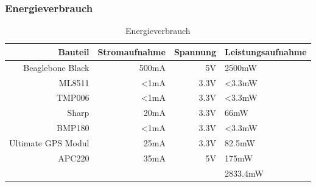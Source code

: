 \subsubsection{Energieverbrauch}
\begin{table}[H]
  \centering
    \begin{tabular}{rrrl}
    \toprule
    \textbf{Bauteil} & \textbf{Stromaufnahme} & \textbf{Spannung} & \textbf{Leistungsaufnahme} \\
    \midrule
    Beaglebone Black  & 500mA & 5V & 2500mW \\
    ML8511& <1mA & 3.3V & <3.3mW \\
    TMP006& <1mA& 3.3V& <3.3mW \\
    Sharp& 20mA & 3.3V& 66mW\\
    BMP180& <1mA& 3.3V& <3.3mW \\
    Ultimate GPS Modul& 25mA&3.3V& 82.5mW \\
    APC220& 35mA & 5V & 175mW\\

    \bottomrule
     & & &2833.4mW \\
    \bottomrule
    \end{tabular}%
    \caption{Energieverbrauch}
  \label{tab:budgetausgaben}%
\end{table}%
